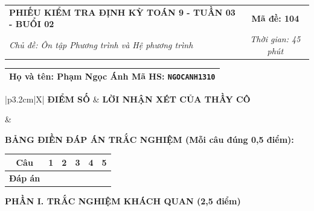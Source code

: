 \documentclass[12pt,a4paper]{article}
\begin{document}
\newpage


\noindent
\begin{tabularx}{\linewidth}{|X|c|}
\hline
\textbf{PHIẾU KIỂM TRA ĐỊNH KỲ TOÁN 9 - TUẦN 03 - BUỔI 02} & \textbf{Mã đề: 104} \\
\textit{Chủ đề: Ôn tập Phương trình và Hệ phương trình} & \textit{Thời gian: 45 phút} \\
\hline
\end{tabularx}

\vspace{1mm}

\noindent
\begin{tabularx}{\linewidth}{|X|}
\hline
\rule[-2mm]{0pt}{7.5mm}\textbf{Họ và tên:} \textbf{\large Phạm Ngọc Ánh} \hfill \textbf{Mã HS:} \texttt{NGOCANH1310} \quad \\
\hline
\end{tabularx}

\vspace{1mm}

\noindent
\begin{tabularx}{\linewidth}{|p{3.2cm}|X|}
\hline
\centering\textbf{ĐIỂM SỐ} & \centering\textbf{LỜI NHẬN XÉT CỦA THẦY CÔ} \tabularnewline
\hline
\rule{0pt}{1.3cm} & \tabularnewline
\hline
\end{tabularx}

\vspace{1.2mm}

\noindent\textbf{BẢNG ĐIỀN ĐÁP ÁN TRẮC NGHIỆM (Mỗi câu đúng 0,5 điểm):}
\vspace{0.8mm}

\noindent
\renewcommand{\arraystretch}{1.35}
\begin{tabularx}{\linewidth}{|c|*{5}{>{\centering\arraybackslash}X|}}
\hline
\textbf{Câu} & \textbf{1} & \textbf{2} & \textbf{3} & \textbf{4} & \textbf{5} \\
\hline
\textbf{Đáp án} & & & & & \\
\hline
\end{tabularx}
\renewcommand{\arraystretch}{1.0}

\vspace{1.5mm}

\noindent\textbf{\large PHẦN I. TRẮC NGHIỆM KHÁCH QUAN (2,5 điểm)}
\vspace{1mm}
\end{document}
